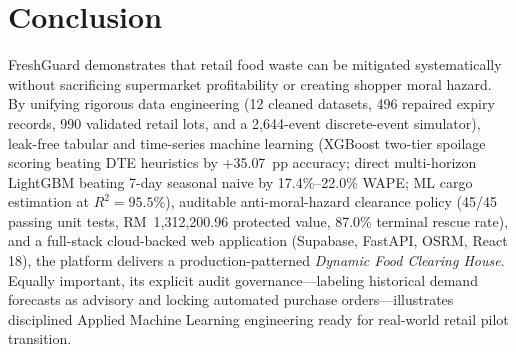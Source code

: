 \documentclass[11pt,a4paper]{article}
\renewcommand{\_}{\oldunderscore\allowbreak}
\begin{document}
\section{Conclusion}

FreshGuard demonstrates that retail food waste can be mitigated systematically without sacrificing supermarket profitability or creating shopper moral hazard. By unifying rigorous data engineering (12 cleaned datasets, 496 repaired expiry records, 990 validated retail lots, and a 2,644-event discrete-event simulator), leak-free tabular and time-series machine learning (XGBoost two-tier spoilage scoring beating DTE heuristics by +35.07~pp accuracy; direct multi-horizon LightGBM beating 7-day seasonal naive by 17.4\%--22.0\% WAPE; ML cargo estimation at $R^2=95.5\%$), auditable anti-moral-hazard clearance policy (45/45 passing unit tests, RM~1,312,200.96 protected value, 87.0\% terminal rescue rate), and a full-stack cloud-backed web application (Supabase, FastAPI, OSRM, React 18), the platform delivers a production-patterned \emph{Dynamic Food Clearing House}. Equally important, its explicit audit governance---labeling historical demand forecasts as advisory and locking automated purchase orders---illustrates disciplined Applied Machine Learning engineering ready for real-world retail pilot transition.
\end{document}
